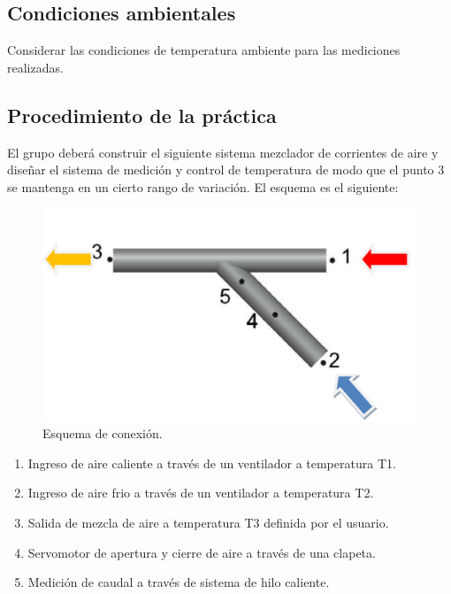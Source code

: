 \documentclass[12pt]{article}
\begin{document}
\subsection{Condiciones ambientales}
Considerar las condiciones de temperatura ambiente para las mediciones realizadas.

\subsection{Procedimiento de la práctica}
El grupo deberá construir el siguiente  sistema mezclador de corrientes de aire  y diseñar el sistema de medición y control de temperatura  de modo que el punto 3 se mantenga en un cierto rango de variación. El esquema es el siguiente:

\begin{figure}[H]
\centering
\includegraphics[scale=0.5]{../Imagenes/Tubos.png}
\caption{Esquema de conexión.}
\label{fgr:Tubos}
\end{figure}

\begin{enumerate}
	\item Ingreso de aire caliente a través de un ventilador a temperatura T1.
	\item Ingreso de aire frio a través de un ventilador a  temperatura T2.
	\item Salida de mezcla de aire  a  temperatura T3 definida por el usuario.
	\item Servomotor de apertura y cierre de aire a través de una clapeta.
	\item Medición de caudal a través de sistema de hilo caliente. 
\end{enumerate}
\end{document}
